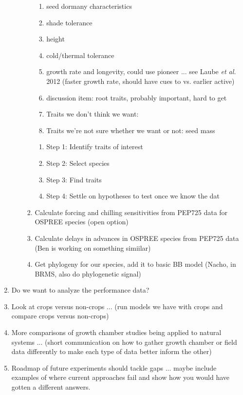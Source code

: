 \documentclass[11pt,letterpaper]{article}
\begin{document}
\begin{enumerate}
\begin{enumerate}
\begin{enumerate}
\begin{enumerate}
\item seed dormany characteristics
\item shade tolerance
\item height
\item cold/thermal tolerance 
\item growth rate and longevity, could use pioneer ... see Laube \emph{et al.} 2012 (faster growth rate, should have cues to vs. earlier active)
\item discussion item: root traits, probably important, hard to get
\item Traits we don't think we want: 
\item Traits we're not sure whether we want or not: seed mass
\end{enumerate}
\begin{enumerate}
\item Step 1: Identify traits of interest
\item Step 2: Select species
\item Step 3: Find traits
\item Step 4: Settle on hypotheses to test once we know the dat
\end{enumerate}
\item Calculate forcing and chilling sensitivities from PEP725 data for OSPREE species (open option)
\item Calculate delays in advances in OSPREE species from PEP725 data (Ben is working on something simiilar)
\item Get phylogeny for our species, add it to basic BB model (Nacho, in BRMS, also do phylogenetic signal)
\end{enumerate}
\end{enumerate}
\item Do we want to analyze the performance data? 
\item Look at crops versus non-crops ... (run models we have with crops and compare crops versus non-crops)
\item More comparisons of growth chamber studies being applied to natural systems ... (short communication on how to gather growth chamber or field data differently to make each type of data better inform the other)
\item Roadmap of future experiments should tackle gaps ... maybe include examples of where current approaches fail and show how you would have gotten a different answers. 
\end{enumerate} 
\end{document}
